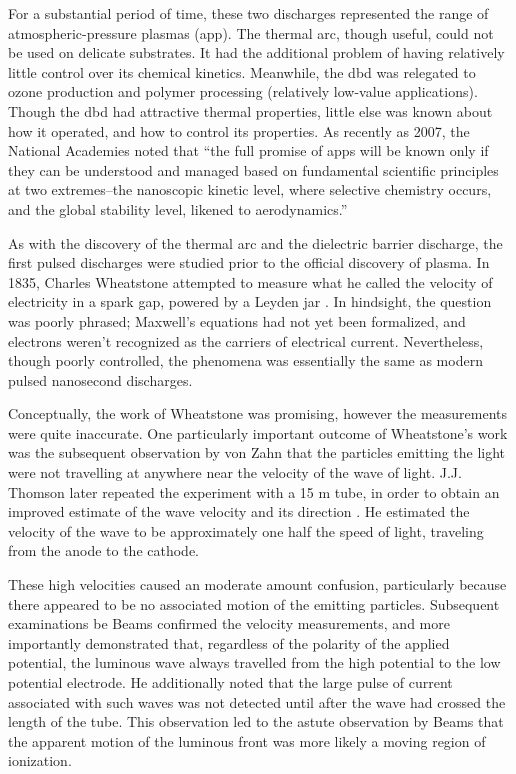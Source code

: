For a substantial period of time, these two  discharges
represented the range of atmospheric-pressure plasmas (\acs{app}). The thermal
arc, though useful, could not be used on delicate substrates. It had the
additional problem of having relatively little control over its chemical
kinetics. Meanwhile, the \acs{dbd} was relegated to ozone production and polymer
processing (relatively low-value applications). Though the \acs{dbd} had
attractive thermal properties, little else was known about how it operated, and
how to control its properties. As recently as 2007, the National Academies
noted that ``the full promise of \acs{app}s will be known only if they can be
understood and managed based on fundamental scientific principles at two
extremes--the nanoscopic kinetic level, where selective chemistry occurs, and
the global stability level, likened to aerodynamics.'' \cite{NA2007}

As with the discovery of the thermal arc and the dielectric barrier discharge,
the first pulsed discharges were studied prior to the official discovery of
plasma. In 1835, Charles Wheatstone attempted to measure what he called the
velocity of electricity in a spark gap, powered by a Leyden jar
\cite{Wheatstone1835}. In hindsight, the question was poorly phrased; Maxwell's
equations had not yet been formalized, and electrons weren't recognized as the
carriers of electrical current. Nevertheless, though poorly controlled, the
phenomena was essentially the same as modern pulsed nanosecond discharges.

Conceptually, the work of Wheatstone was promising, however the measurements
were quite inaccurate. One particularly important outcome of Wheatstone's work
was the subsequent observation by von Zahn \cite{Zahn1879} that the particles
emitting the light were not travelling at anywhere near the velocity of the wave
of light. J.J. Thomson later repeated the experiment with a 15 m tube, in order
to obtain an improved estimate of the wave velocity and its direction
\cite{Thomson1893}. He estimated the velocity of the wave to be approximately
one half the speed of light, traveling from the anode to the cathode.

These high velocities caused an moderate amount confusion, particularly because
there appeared to be no associated motion of the emitting particles. Subsequent
examinations be Beams \cite{Beams1930} confirmed the velocity measurements, and
more importantly demonstrated that, regardless of the polarity of the applied
potential, the luminous wave always travelled from the high potential to the low
potential electrode. He additionally noted that the large pulse of current
associated with such waves was not detected until after the wave had crossed the
length of the tube. This observation led to the astute observation by Beams that
the apparent motion of the luminous front was more likely a moving region of
ionization.



